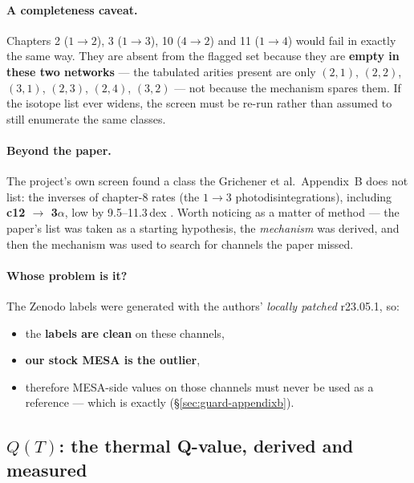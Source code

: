 \paragraph{A completeness caveat.} Chapters 2 ($1{\to}2$), 3 ($1{\to}3$), 10
($4{\to}2$) and 11 ($1{\to}4$) would fail  in exactly the same
way. They are absent from the flagged set because they are \textbf{empty in
these two networks} --- the tabulated arities present are only $(2,1)$, $(2,2)$,
$(3,1)$, $(2,3)$, $(2,4)$, $(3,2)$ \derivedhere{} --- not because the mechanism
spares them. If the isotope list ever widens, the screen must be re-run rather
than assumed to still enumerate the same classes.

\paragraph{Beyond the paper.} The project's own screen found a class the
Grichener et al.\ Appendix~B does not list: the inverses of chapter-8 rates (the
$1 \to 3$ photodisintegrations), including \textbf{c12 $\to$ 3$\alpha$}, low by
9.5--11.3\,dex . Worth noticing as a matter of method ---
the paper's list was taken as a starting hypothesis, the \emph{mechanism} was
derived, and then the mechanism was used to search for channels the paper
missed.

\paragraph{Whose problem is it?} The Zenodo labels were generated with the
authors' \emph{locally patched} r23.05.1, so:

\begin{itemize}
\item the \textbf{labels are clean} on these channels,
\item \textbf{our stock MESA is the outlier},
\item therefore MESA-side values on those channels must never be used as a
      reference --- which is exactly 
      (\S\ref{sec:guard-appendixb}).
\end{itemize}

\subsection{\texorpdfstring{$Q(T)$}{Q(T)}: the thermal Q-value, derived and measured}
\label{sec:qoft}


